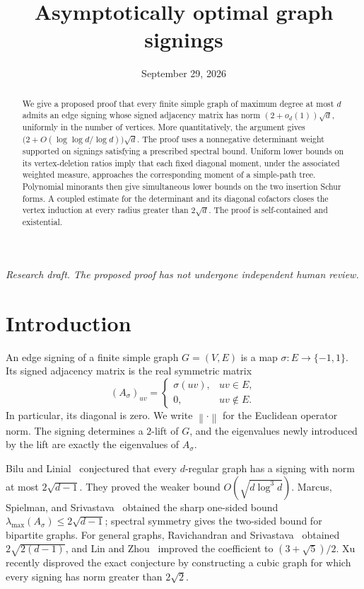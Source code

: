 \documentclass[11pt]{article}
\title{Asymptotically optimal graph signings}
\author{}
\date{September 29, 2026}
\numberwithin{equation}{section}
\theoremstyle{remark}
\newcommand{\norm}[1]{\left\lVert#1\right\rVert}
\begin{document}
\maketitle
\begin{abstract}
We give a proposed proof that every finite simple graph of maximum
degree at most $d$ admits an edge signing whose signed adjacency
matrix has norm $(2+o_d(1))\sqrt d$, uniformly in the number of
vertices. More quantitatively, the argument gives
$\bigl(2+O(\log\log d/\log d)\bigr)\sqrt d$.
The proof uses a nonnegative determinant weight supported on
signings satisfying a prescribed spectral bound. Uniform lower
bounds on its vertex-deletion ratios imply that each fixed diagonal
moment, under the associated weighted measure, approaches the
corresponding moment of a simple-path tree. Polynomial minorants
then give simultaneous lower bounds on the two insertion Schur
forms. A coupled estimate for the determinant and its diagonal
cofactors closes the vertex induction at every radius greater than
$2\sqrt d$. The proof is self-contained and existential.
\end{abstract}

\begin{center}
\small\textit{Research draft. The proposed proof has not undergone
independent human review.}
\end{center}

\section{Introduction}

An edge signing of a finite simple graph $G=(V,E)$ is a map
$\sigma:E\to\{-1,1\}$. Its signed adjacency matrix is the real
symmetric matrix
\[
 (A_\sigma)_{uv}=
 \begin{cases}
 \sigma(uv),&uv\in E,\\
 0,&uv\notin E.
 \end{cases}
\]
In particular, its diagonal is zero. We write $\norm{\cdot}$ for
the Euclidean operator norm. The signing determines a $2$-lift of
$G$, and the eigenvalues newly introduced by the lift are exactly
the eigenvalues of $A_\sigma$.

Bilu and Linial~\cite{BL} conjectured that every $d$-regular graph
has a signing with norm at most $2\sqrt{d-1}$. They proved the
weaker bound $O(\sqrt{d\log^3d})$. Marcus, Spielman, and
Srivastava~\cite{MSS} obtained the sharp one-sided bound
$\lambda_{\max}(A_\sigma)\le2\sqrt{d-1}$; spectral symmetry gives
the two-sided bound for bipartite graphs. For general graphs,
Ravichandran and Srivastava~\cite{RS} obtained
$2\sqrt{2(d-1)}$, and Lin and Zhou~\cite{LZ} improved the coefficient
to $(3+\sqrt5)/2$. Xu~\cite{Xu} recently disproved the exact
conjecture by constructing a cubic graph for which every signing
has norm greater than $2\sqrt2$.
\end{document}
